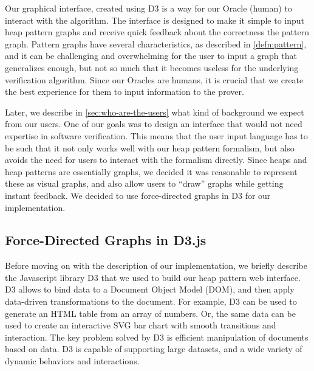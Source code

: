 Our graphical interface, created using D3 \cite{d3js} is a way for our Oracle (human) to interact with the \verifier algorithm. The interface is designed to make it simple to input heap pattern graphs and receive quick feedback about the correctness the pattern graph. Pattern graphs have several characteristics, as described in \autoref{defn:pattern}, and it can be challenging and overwhelming for the user to input a graph that generalizes enough, but not so much that it becomes useless for the underlying verification algorithm. Since our Oracles are humans, it is crucial that we create the best experience for them to input information to the prover.

Later, we describe in \autoref{sec:who-are-the-users} what kind of background we expect from our users. One of our goals was to design an interface that would not need expertise in software verification. This means that the user input language has to be such that it not only works well with our heap pattern formalism, but also avoids the need for users to interact with the formalism directly. Since heaps and heap patterns are essentially graphs, we decided it was reasonable to represent these as visual graphs, and also allow users to ``draw'' graphs while getting instant feedback. We decided to use force-directed graphs in D3 for our implementation.

\subsection{Force-Directed Graphs in D3.js}
Before moving on with the description of our implementation, we briefly describe the Javascript library D3 that we used to build our heap pattern web interface. D3 allows to bind data to a Document Object Model (DOM), and then apply data-driven transformations to the document. For example, D3 can be used to generate an HTML table from an array of numbers. Or, the same data can be used to create an interactive SVG bar chart with smooth transitions and interaction. The key problem solved by D3 is efficient manipulation of documents based on data. D3 is capable of supporting large datasets, and a wide variety of dynamic behaviors and interactions.

